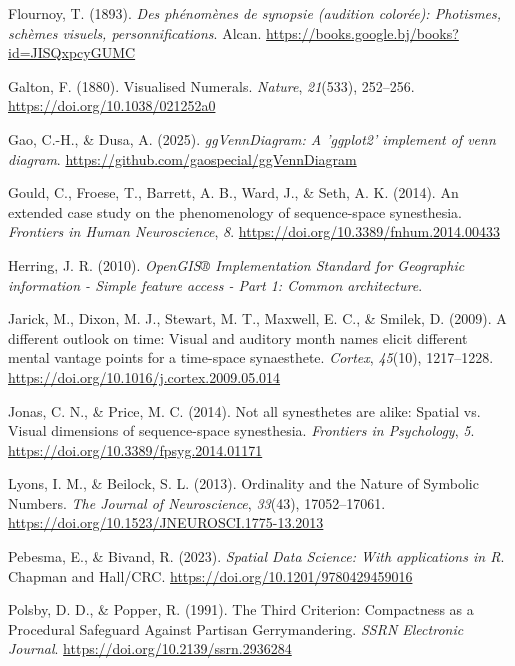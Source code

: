 \documentclass[
  man,
  longtable,
  a4paper,
  nolmodern,
  notxfonts,
  notimes,
  colorlinks=true,linkcolor=blue,citecolor=blue,urlcolor=blue]{apa7}
\newlength{\cslhangindent}
\newenvironment{CSLReferences}[2] %
 {\begin{list}{}{%
  \setlength{\itemindent}{0pt}
  \setlength{\leftmargin}{0pt}
  \setlength{\parsep}{0pt}
  \ifodd #1
   \setlength{\leftmargin}{\cslhangindent}
   \setlength{\itemindent}{-1\cslhangindent}
  \fi
  \setlength{\itemsep}{#2\baselineskip}}}
 {\end{list}}
\begin{document}
\begin{CSLReferences}{1}{0}
Flournoy, T. (1893). \emph{Des phénomènes de synopsie (audition
colorée): Photismes, schèmes visuels, personnifications}. Alcan.
\url{https://books.google.bj/books?id=JISQxpcyGUMC}

Galton, F. (1880). Visualised Numerals. \emph{Nature}, \emph{21}(533),
252--256. \url{https://doi.org/10.1038/021252a0}

Gao, C.-H., \& Dusa, A. (2025). \emph{{ggVennDiagram}: A 'ggplot2'
implement of venn diagram}.
\url{https://github.com/gaospecial/ggVennDiagram}

Gould, C., Froese, T., Barrett, A. B., Ward, J., \& Seth, A. K. (2014).
An extended case study on the phenomenology of sequence-space
synesthesia. \emph{Frontiers in Human Neuroscience}, \emph{8}.
\url{https://doi.org/10.3389/fnhum.2014.00433}

Herring, J. R. (2010). \emph{OpenGIS® Implementation Standard for
Geographic information - Simple feature access - Part 1: Common
architecture}.

Jarick, M., Dixon, M. J., Stewart, M. T., Maxwell, E. C., \& Smilek, D.
(2009). A different outlook on time: Visual and auditory month names
elicit different mental vantage points for a time-space synaesthete.
\emph{Cortex}, \emph{45}(10), 1217--1228.
\url{https://doi.org/10.1016/j.cortex.2009.05.014}

Jonas, C. N., \& Price, M. C. (2014). Not all synesthetes are alike:
Spatial vs. Visual dimensions of sequence-space synesthesia.
\emph{Frontiers in Psychology}, \emph{5}.
\url{https://doi.org/10.3389/fpsyg.2014.01171}

Lyons, I. M., \& Beilock, S. L. (2013). Ordinality and the Nature of
Symbolic Numbers. \emph{The Journal of Neuroscience}, \emph{33}(43),
17052--17061. \url{https://doi.org/10.1523/JNEUROSCI.1775-13.2013}

Pebesma, E., \& Bivand, R. (2023). \emph{{Spatial Data Science: With
applications in {R}}}. {Chapman and Hall/CRC}.
\url{https://doi.org/10.1201/9780429459016}

Polsby, D. D., \& Popper, R. (1991). The Third Criterion: Compactness as
a Procedural Safeguard Against Partisan Gerrymandering. \emph{SSRN
Electronic Journal}. \url{https://doi.org/10.2139/ssrn.2936284}


\end{CSLReferences}
\end{document}
